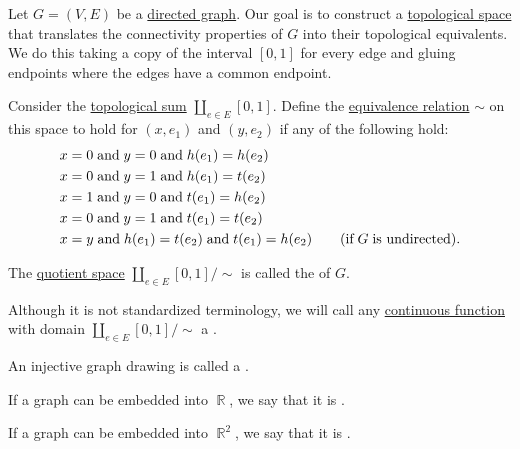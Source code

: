 \begin{definition}\label{def:graph_geometric_realization}
  Let \( G = (V, E) \) be a \hyperref[def:graph/directed]{directed graph}. Our goal is to construct a \hyperref[def:topological_space]{topological space} that translates the connectivity properties of \( G \) into their topological equivalents. We do this taking a copy of the interval \( [0, 1] \) for every edge and gluing endpoints where the edges have a common endpoint.

  Consider the \hyperref[def:topological_sum]{topological sum} \( \coprod_{e \in E} [0, 1] \). Define the \hyperref[def:equivalence_relation]{equivalence relation} \( {\sim} \) on this space to hold for \( (x, e_1) \) and \( (y, e_2) \) if any of the following hold:
  \begin{align*}
    &x = 0 \T{and} y = 0 \T{and} h(e_1) = h(e_2) \\
    &x = 0 \T{and} y = 1 \T{and} h(e_1) = t(e_2) \\
    &x = 1 \T{and} y = 0 \T{and} t(e_1) = h(e_2) \\
    &x = 0 \T{and} y = 1 \T{and} t(e_1) = t(e_2) \\
    &x = y \T{and} h(e_1) = t(e_2) \T{and} t(e_1) = h(e_2) \quad\quad (\T{if} G \T{is undirected}).
  \end{align*}

  The \hyperref[def:topological_quotient]{quotient space} \( \coprod_{e \in E} [0, 1] / {\sim} \) is called the  of \( G \).

  \begin{thmenum}
     Although it is not standardized terminology, we will call any \hyperref[def:global_continuity]{continuous function} with domain \( \coprod_{e \in E} [0, 1] / {\sim} \) a .

     An injective graph drawing is called a .

     If a graph can be embedded into \( \BbbR \), we say that it is .

     If a graph can be embedded into \( \BbbR^2 \), we say that it is .
  \end{thmenum}
\end{definition}

